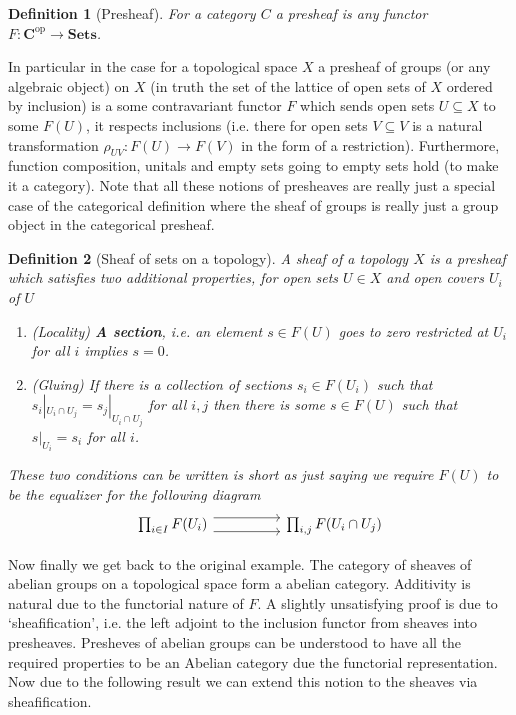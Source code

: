 \documentclass[12pt]{article}
\numberwithin{equation}{section}
\newtheorem{definition}{Definition}[section]
\begin{document}
\begin{appendices}
\begin{enumerate}
		\begin{definition}[Presheaf]
			For a category $C$ a presheaf is any functor $F: \mathbf{C}^{\mathrm{op}}\to \mathbf{Sets}$.
		\end{definition}
		In particular in the case for a topological space $X$ a presheaf of groups (or any algebraic object) on $X$ (in truth the set of the lattice of open sets of $X$ ordered by inclusion) is a some contravariant functor $F$ which sends open sets $U \subseteq X$ to some $F(U)$, it respects inclusions (i.e. there for open sets $V \subseteq V $ is a natural transformation $\rho_{UV}: F(U)\to F(V)$ in the form of a restriction). Furthermore, function composition, unitals and empty sets going to empty sets hold (to make it a category). Note that all these notions of presheaves are really just a special case of the categorical definition where the sheaf of groups is really just a group object in the categorical presheaf.
		\begin{definition}[Sheaf of sets on a topology]
			A sheaf of a topology $X$ is a presheaf which satisfies two additional properties, for open sets $U \in X$ and open covers ${U_i}$ of $U$
			\begin{enumerate}
				\item (Locality)  \textbf{A section}, i.e. an element $s \in F(U)$ goes to zero restricted at $U_i$ for all $i$ implies $s=0$.
				\item (Gluing) If there is a collection of sections $s_i \in F(U_i)$ such that $s_i|_{U_i \cap U_j}=s_j|_{U_i \cap U_j}$ for all $i,j$ then there is some $s \in F(U)$ such that $s|_{U_i}=s_i$ for all $i$.
			\end{enumerate}
			
			These two conditions can be written is short as just saying we require $F(U)$ to be the equalizer for the following diagram
			\[\begin{tikzcd}
				{\prod_{i \in I} F(U_i)} && {\prod_{i,j}F(U_i \cap U_j)}
				\arrow[shift right=2, from=1-1, to=1-3]
				\arrow[shift left=2, from=1-1, to=1-3]
			\end{tikzcd}\]
		\end{definition}
		
		Now finally we get back to the original example. The category of sheaves of abelian groups on a topological space form a abelian category. Additivity is natural due to the functorial nature of $F$. A slightly unsatisfying proof is due to `sheafification', i.e. the left adjoint to the inclusion functor from sheaves into presheaves. Presheves of abelian groups can be understood to have all the required properties to be an Abelian category due the functorial representation. Now due to the following result \cite{stacks1} we can extend this notion to the sheaves via sheafification.
	\end{enumerate}
	

\end{appendices}
\end{document}

